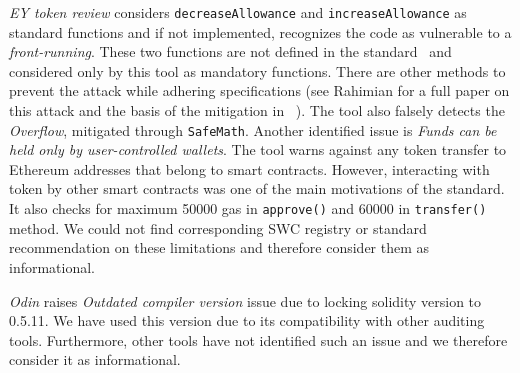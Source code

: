 \textit{EY token review} considers \texttt{decreaseAllowance} and \texttt{increaseAllowance} as standard \erc functions and if not implemented, recognizes the code as vulnerable to a \textit{front-running}. These two functions are not defined in the \erc standard~\cite{ERC20Std} and considered only by this tool as mandatory functions. There are other methods to prevent the attack while adhering \erc specifications (see Rahimian \etal for a full paper on this attack and the basis of the mitigation in \sys~\cite{ERC20MWA}). The tool also falsely detects the \textit{Overflow}, mitigated through \texttt{SafeMath}. Another identified issue is \textit{Funds can be held only by user-controlled wallets}. The tool warns against any token transfer to Ethereum addresses that belong to smart contracts. However, interacting with \erc token by other smart contracts was one of the main motivations of the standard. It also checks for maximum 50000 gas in \texttt{approve()} and 60000 in \texttt{transfer()} method. We could not find corresponding SWC registry or standard recommendation on these limitations and therefore consider them as informational.

\textit{Odin} raises \textit{Outdated compiler version} issue due to locking solidity version to 0.5.11. We have used this version due to its compatibility with other auditing tools. Furthermore, other tools have not identified such an issue and we therefore consider it as informational.



%
